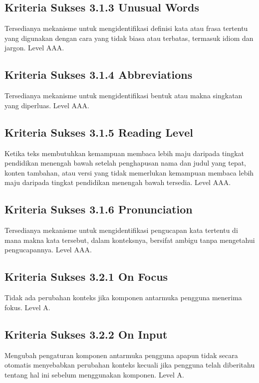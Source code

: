 \subsection{Kriteria Sukses 3.1.3 Unusual Words}
\label{sec:kriteria_3.1.3}
Tersedianya mekanisme untuk mengidentifikasi definisi kata atau frasa tertentu yang digunakan dengan cara yang tidak biasa atau terbatas, termasuk idiom dan jargon.
Level AAA.

\subsection{Kriteria Sukses 3.1.4 Abbreviations}
\label{sec:kriteria_3.1.4}
Tersedianya mekanisme untuk mengidentifikasi bentuk atau makna singkatan yang diperluas.
Level AAA.

\subsection{Kriteria Sukses 3.1.5 Reading Level}
\label{sec:kriteria_3.1.5}
Ketika teks membutuhkan kemampuan membaca lebih maju daripada tingkat pendidikan menengah bawah setelah penghapusan nama dan judul yang tepat, konten tambahan, atau versi yang tidak memerlukan kemampuan membaca lebih maju daripada tingkat pendidikan menengah bawah tersedia.
Level AAA.

\subsection{Kriteria Sukses 3.1.6 Pronunciation}
\label{sec:kriteria_3.1.6}
Tersedianya mekanisme untuk mengidentifikasi pengucapan kata tertentu di mana makna kata tersebut, dalam konteksnya, bersifat ambigu tanpa mengetahui pengucapannya.
Level AAA.

\subsection{Kriteria Sukses 3.2.1 On Focus}
\label{sec:kriteria_3.2.1}
Tidak ada perubahan konteks jika komponen antarmuka pengguna menerima fokus.
Level A.

\subsection{Kriteria Sukses 3.2.2 On Input}
\label{sec:kriteria_3.2.2}
Mengubah pengaturan komponen antarmuka pengguna apapun tidak secara otomatis menyebabkan perubahan konteks kecuali jika pengguna telah diberitahu tentang hal ini sebelum menggunakan komponen.
Level A.

